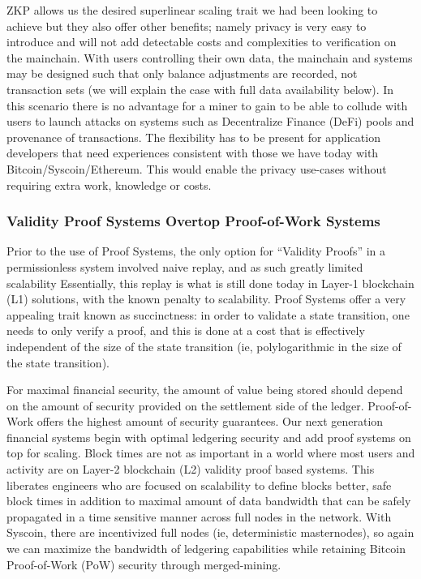 \documentclass[peerreview]{ieeesyscoin}
\begin{document}
ZKP allows us the desired superlinear scaling trait we had been looking to achieve but they also offer other benefits; namely privacy is very easy to introduce and will not add detectable costs and complexities to verification on the mainchain. With users controlling their own data, the mainchain and systems may be designed such that only balance adjustments are recorded, not transaction sets (we will explain the case with full data availability below). In this scenario there is no advantage for a miner to gain to be able to collude with users to launch attacks on systems such as Decentralize Finance (DeFi) pools and provenance of transactions. The flexibility has to be present for application developers that need experiences consistent with those we have today with Bitcoin/Syscoin/Ethereum. This would enable the privacy use-cases without requiring extra work, knowledge or costs.


\subsubsection{Validity Proof Systems Overtop Proof-of-Work Systems}

Prior to the use of Proof Systems, the only option for “Validity Proofs” in a permissionless system involved naive replay, and as such greatly limited scalability Essentially, this replay is what is still done today in Layer-1 blockchain (L1) solutions, with the known penalty to scalability. Proof Systems offer a very appealing trait known as succinctness: in order to validate a state transition, one needs to only verify a proof, and this is done at a cost that is effectively independent of the size of the state transition (ie, polylogarithmic in the size of the state transition).

For maximal financial security, the amount of value being stored should depend on the amount of security provided on the settlement side of the ledger. Proof-of-Work offers the highest amount of security guarantees. Our next generation financial systems begin with optimal ledgering security and add proof systems on top for scaling. Block times are not as important in a world where most users and activity are on Layer-2 blockchain (L2) validity proof based systems. This liberates engineers who are focused on scalability to define blocks better, safe block times in addition to  maximal amount of data bandwidth that can be safely propagated in a time sensitive manner across full nodes in the network. With Syscoin, there are incentivized full nodes (ie, deterministic masternodes), so again we can maximize the bandwidth of ledgering capabilities while retaining Bitcoin Proof-of-Work (PoW) security through merged-mining.
\end{document}
